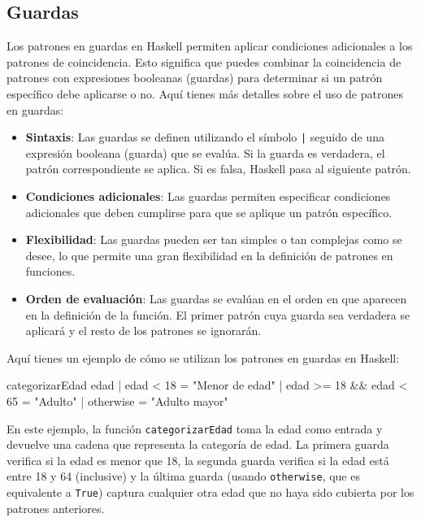 \documentclass{article}
\begin{document}
\subsection{Guardas}
Los patrones en guardas en Haskell permiten aplicar condiciones adicionales a los patrones de coincidencia. Esto significa que puedes combinar la coincidencia de patrones con expresiones booleanas (guardas) para determinar si un patrón específico debe aplicarse o no. Aquí tienes más detalles sobre el uso de patrones en guardas:

\begin{itemize}
    \item \textbf{Sintaxis}: Las guardas se definen utilizando el símbolo \texttt{|} seguido de una expresión booleana (guarda) que se evalúa. Si la guarda es verdadera, el patrón correspondiente se aplica. Si es falsa, Haskell pasa al siguiente patrón.
    
    \item \textbf{Condiciones adicionales}: Las guardas permiten especificar condiciones adicionales que deben cumplirse para que se aplique un patrón específico.
    
    \item \textbf{Flexibilidad}: Las guardas pueden ser tan simples o tan complejas como se desee, lo que permite una gran flexibilidad en la definición de patrones en funciones.
    
    \item \textbf{Orden de evaluación}: Las guardas se evalúan en el orden en que aparecen en la definición de la función. El primer patrón cuya guarda sea verdadera se aplicará y el resto de los patrones se ignorarán.
\end{itemize}

Aquí tienes un ejemplo de cómo se utilizan los patrones en guardas en Haskell:

\begin{haskell}
categorizarEdad edad
    | edad < 18 = "Menor de edad"
    | edad >= 18 && edad < 65 = "Adulto"
    | otherwise = "Adulto mayor"
\end{haskell}

En este ejemplo, la función \texttt{categorizarEdad} toma la edad como entrada y devuelve una cadena que representa la categoría de edad. La primera guarda verifica si la edad es menor que 18, la segunda guarda verifica si la edad está entre 18 y 64 (inclusive) y la última guarda (usando \texttt{otherwise}, que es equivalente a \texttt{True}) captura cualquier otra edad que no haya sido cubierta por los patrones anteriores.
\end{document}
